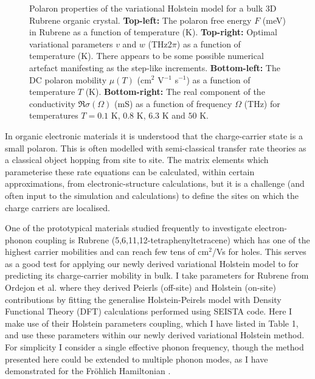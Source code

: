 \begin{figure}[!tbp]
\begin{subfigure}[b]{0.49\textwidth}
  \end{subfigure}
  \caption{Polaron properties of the variational Holstein model for a bulk 3D Rubrene organic crystal. \textbf{Top-left:} The polaron free energy $F$ (meV) in Rubrene as a function of temperature (K). \textbf{Top-right:} Optimal variational parameters $v$ and $w$ (THz2$\pi$) as a function of temperature (K). There appears to be some possible numerical artefact manifesting as the step-like increments. \textbf{Bottom-left:} The DC polaron mobility $\mu(T)$ (cm$^2$ V$^{-1}$ s$^{-1}$) as a function of temperature $T$ (K). \textbf{Bottom-right:} The real component of the conductivity $\Re\sigma(\Omega)$ (mS) as a function of frequency $\Omega$ (THz) for temperatures $T = 0.1$ K, $0.8$ K, $6.3$ K and $50$ K.}
  \label{fig:rubrene}
\end{figure}

In organic electronic materials it is understood that the charge-carrier state is a small polaron.  This is often modelled with semi-classical transfer rate theories as a classical object hopping from site to site. The matrix elements which parameterise these rate equations can be calculated, within certain approximations, from electronic-structure calculations, but it is a challenge (and often input to the simulation and calculations) to define the sites on which the charge carriers are localised. 
\newline

One of the prototypical materials studied frequently to investigate electron-phonon coupling is Rubrene (5,6,11,12-tetraphenyltetracene) which has one of the highest carrier mobilities and can reach few tens of cm$^2$/Vs for holes. This serves as a good test for applying our newly derived variational Holstein model to for predicting its charge-carrier mobility in bulk. I take parameters for Rubrene from Ordejon et al. \cite{Ordejn2017} where they derived Peierls (off-site) and Holstein (on-site) contributions by fitting the generalise Holstein-Peirels model with Density Functional Theory (DFT) calculations performed using SEISTA code. Here I make use of their Holstein parameters coupling, which I have listed in Table 1, and use these parameters within our newly derived variational Holstein method. For simplicity I consider a single effective phonon frequency, though the method presented here could be extended to multiple phonon modes, as I have demonstrated for the Fr\"ohlich Hamiltonian \cite{Martin2022}.
\newline

